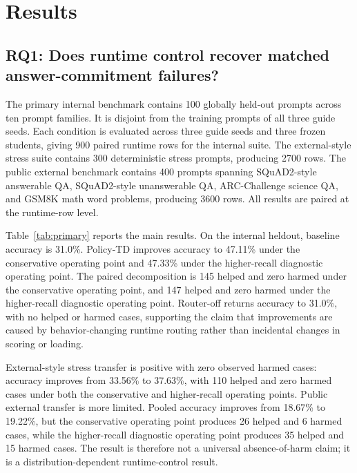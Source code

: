 \documentclass[11pt]{article}
\newcommand{\policytd}{Policy-TD}
\begin{document}
\section{Results}
\subsection{RQ1: Does runtime control recover matched answer-commitment failures?}
The primary internal benchmark contains 100 globally held-out prompts across ten prompt families. It is disjoint from the training prompts of all three guide seeds. Each condition is evaluated across three guide seeds and three frozen students, giving 900 paired runtime rows for the internal suite. The external-style stress suite contains 300 deterministic stress prompts, producing 2700 rows. The public external benchmark contains 400 prompts spanning SQuAD2-style answerable QA, SQuAD2-style unanswerable QA, ARC-Challenge science QA, and GSM8K math word problems, producing 3600 rows. All results are paired at the runtime-row level.

Table~\ref{tab:primary} reports the main results. On the internal heldout, baseline accuracy is 31.0\%. \policytd{} improves accuracy to 47.11\% under the conservative operating point and 47.33\% under the higher-recall diagnostic operating point. The paired decomposition is 145 helped and zero harmed under the conservative operating point, and 147 helped and zero harmed under the higher-recall diagnostic operating point. Router-off returns accuracy to 31.0\%, with no helped or harmed cases, supporting the claim that improvements are caused by behavior-changing runtime routing rather than incidental changes in scoring or loading.

External-style stress transfer is positive with zero observed harmed cases: accuracy improves from 33.56\% to 37.63\%, with 110 helped and zero harmed cases under both the conservative and higher-recall operating points. Public external transfer is more limited. Pooled accuracy improves from 18.67\% to 19.22\%, but the conservative operating point produces 26 helped and 6 harmed cases, while the higher-recall diagnostic operating point produces 35 helped and 15 harmed cases. The result is therefore not a universal absence-of-harm claim; it is a distribution-dependent runtime-control result.
\end{document}
